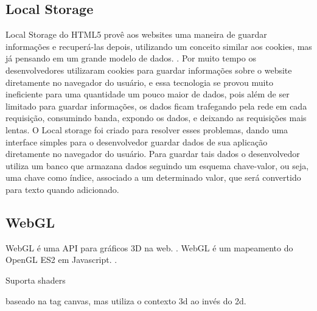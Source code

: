 
\subsection{Local Storage}

Local Storage do HTML5 provê aos websites uma maneira de guardar
informações e recuperá-las depois, utilizando um conceito similar aos
cookies, mas já pensando em um grande modelo de dados. \cite{pilgrim2010html5}.
Por muito tempo os desenvolvedores utilizaram cookies para guardar
informações sobre o website diretamente no navegador do usuário, e
essa tecnologia se provou muito ineficiente para uma quantidade um
pouco maior de dados, pois além de ser limitado para guardar informações,
os dados ficam trafegando pela rede em cada requisição, consumindo
banda, expondo os dados, e deixando as requisições mais lentas.
O Local storage foi criado para resolver esses problemas, dando uma
interface simples para o desenvolvedor guardar dados de sua
aplicação diretamente no navegador do usuário. Para guardar tais dados
o desenvolvedor utiliza um banco que armazana dados seguindo um
esquema chave-valor, ou seja, uma chave como índice, associado a um
determinado valor, que será convertido para texto quando adicionado.


\subsection{WebGL}

WebGL é uma API para gráficos 3D na web. \cite{lubbers2010pro}.
WebGL é um mapeamento do OpenGL ES2 em Javascript. \cite{lubbers2010pro}.


Suporta shaders

baseado na tag canvas, mas utiliza o contexto 3d ao invés do 2d.

%
%

\clearpage
